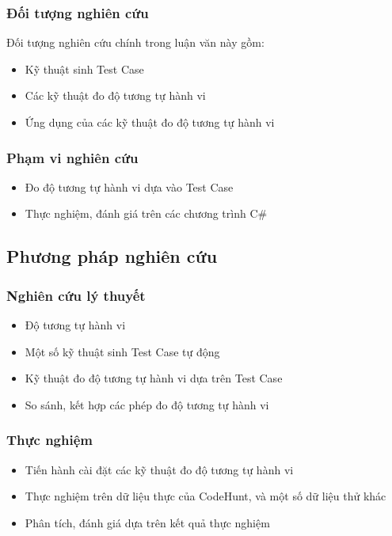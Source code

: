 \subsubsection*{Đối tượng nghiên cứu}

Đối tượng nghiên cứu chính trong luận văn này gồm:
\begin{itemize}
\item Kỹ thuật sinh Test Case
\item Các kỹ thuật đo độ tương tự hành vi
\item Ứng dụng của các kỹ thuật đo độ tương tự hành vi
\end{itemize}
	
\subsubsection*{Phạm vi nghiên cứu}
\begin{itemize}
\item Đo độ tương tự hành vi dựa vào Test Case
\item Thực nghiệm, đánh giá trên các chương trình C\#
\end{itemize}


\subsection{Phương pháp nghiên cứu}
\subsubsection*{Nghiên cứu lý thuyết}
\begin{itemize}
\item Độ tương tự hành vi
\item Một số kỹ thuật sinh Test Case tự động
\item Kỹ thuật đo độ tương tự hành vi dựa trên Test Case
\item So sánh, kết hợp các phép đo độ tương tự hành vi
\end{itemize}
		
\subsubsection*{Thực nghiệm}
\begin{itemize}
\item Tiến hành cài đặt các kỹ thuật đo độ tương tự hành vi
\item Thực nghiệm trên dữ liệu thực của CodeHunt, và một số dữ liệu thử khác
\item Phân tích, đánh giá dựa trên kết quả thực nghiệm
\end{itemize}


